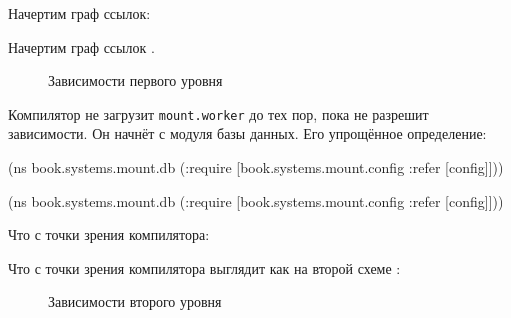
\ifx\MODE\PRINT

\noindent
Начертим граф ссылок:

\begin{figure}[h!]
\end{figure}

\fi

\ifx\MODE\EBOOK

\noindent
Начертим граф ссылок .

\begin{figure}[ht!]
  \caption{Зависимости первого уровня}
  \label{fig:chart-sys-2}
\end{figure}

\fi

Компилятор не загрузит \verb|mount.worker| до тех пор, пока не разрешит
зависимости. Он начнёт с модуля базы данных. Его упрощённое определение:

\ifx\DEVICETYPE\MOBILE

\begin{english}
  \begin{clojure}
(ns book.systems.mount.db
  (:require
   [book.systems.mount.config
    :refer [config]]))
  \end{clojure}
\end{english}

\else

\begin{english}
  \begin{clojure}
(ns book.systems.mount.db
  (:require
   [book.systems.mount.config :refer [config]]))
  \end{clojure}
\end{english}

\fi

\ifx\MODE\PRINT


\noindent
Что с точки зрения компилятора:

\begin{figure}[h!]
\end{figure}

\fi

\ifx\MODE\EBOOK

\noindent
Что с точки зрения компилятора выглядит как на второй схеме
:

\begin{figure}[b!]
  \caption{Зависимости второго уровня}
  \label{fig:chart-sys-3}
\end{figure}

